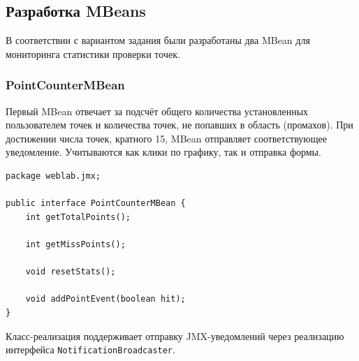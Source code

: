 \subsection{Разработка MBeans}

В соответствии с вариантом задания были разработаны два MBean для мониторинга статистики проверки точек.

\subsubsection{PointCounterMBean}

Первый MBean отвечает за подсчёт общего количества установленных пользователем точек и количества точек, не попавших в область (промахов). При достижении числа точек, кратного 15, MBean отправляет соответствующее уведомление. Учитываются как клики по графику, так и отправка формы.

\begin{lstlisting}[caption=Листинг интерфейса \texttt{PointCounterMBean}.]
package weblab.jmx;

public interface PointCounterMBean {
    int getTotalPoints();

    int getMissPoints();

    void resetStats();

    void addPointEvent(boolean hit);
}
\end{lstlisting}

Класс-реализация поддерживает отправку JMX-уведомлений через реализацию интерфейса \texttt{NotificationBroadcaster}.

